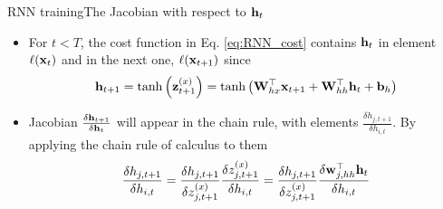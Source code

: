 \documentclass{beamer}
\begin{document}
\begin{frame}{RNN training}{The Jacobian with respect to ${\bf h}_t$}
\begin{itemize}
    \item For $t<T$, the cost function in Eq. \eqref{eq:RNN_cost} contains ${\bf h}_t$ in element $\ell({\bf x}_t)$ and in the next one, $\ell({\bf x}_{t+1})$ since
\begin{equation}
    {\bf h}_{t+1}=\tanh\left({\bf z}^{(x)}_{t+1}\right)=\tanh\left({\bf W}_{hx}^\top{\bf x}_{t+1} + {\bf W}_{hh}^\top{\bf h}_{t}+{\bf b}_{h}\right)
\end{equation}


\item Jacobian $\frac{\delta {\bf h}_{t+1}}{\delta {\bf h}_t} $ will appear in the chain rule, with elements $\frac{\delta h_{j,t+1}}{\delta h_{i,t}}$. By applying the chain rule of calculus to them
\begin{equation}\label{eq:deriv_h_jtau}
    \frac{\delta h_{j,t+1}}{\delta h_{i,t}} = \frac{\delta h_{j,t+1}}{\delta z^{(x)}_{j,t+1}} \frac{\delta z^{(x)}_{j,t+1}}{\delta h_{i,t}} = \frac{\delta h_{j,t+1}}{\delta z^{(x)}_{j,t+1}} \frac{\delta {\bf w}_{j,hh}^\top {\bf h}_{t}}{\delta h_{i,t}}
\end{equation}

\end{itemize}

\end{frame}
\end{document}
